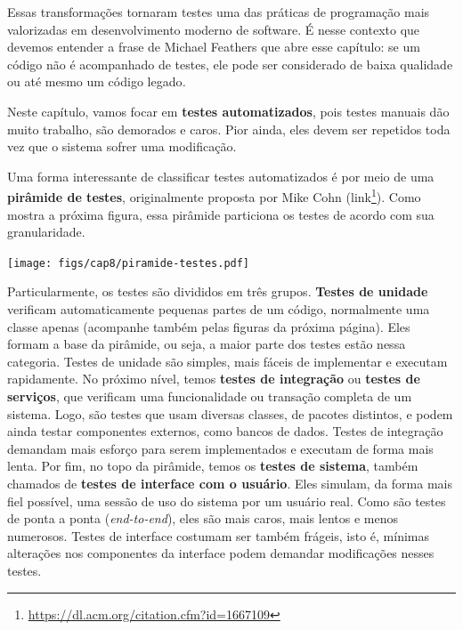 \documentclass[
  11pt,
  twoside]{book}
\DeclareRobustCommand{\href}[2]{#2\footnote{\url{#1}}}
\let\origfigure\figure
\let\endorigfigure\endfigure
\renewenvironment{figure}[1][2] {
    \expandafter\origfigure\expandafter[!h]
} {
    \endorigfigure
}
\begin{document}
Essas transformações tornaram testes uma das práticas de programação
mais valorizadas em desenvolvimento moderno de software. É nesse
contexto que devemos entender a frase de Michael Feathers que abre esse
capítulo: se um código não é acompanhado de testes, ele pode ser
considerado de baixa qualidade ou até mesmo um código legado\emph{.}

Neste capítulo, vamos focar em \textbf{testes automatizados}, pois
testes manuais dão muito trabalho, são demorados e caros. Pior ainda,
eles devem ser repetidos toda vez que o sistema sofrer uma modificação.

 
Uma forma interessante de classificar testes automatizados é por meio de
uma \textbf{pirâmide de testes}, originalmente proposta por Mike Cohn
(\href{https://dl.acm.org/citation.cfm?id=1667109}{link}). Como mostra a
próxima figura, essa pirâmide particiona os testes de acordo com sua
granularidade.

\begin{figure}
\centering
\texttt{[image: figs/cap8/piramide-testes.pdf]}
\caption{Pirâmide de testes}
\end{figure}

 Particularmente, os testes
são divididos em três grupos. \textbf{Testes de unidade} verificam
automaticamente pequenas partes de um código, normalmente uma classe
apenas (acompanhe também pelas figuras da próxima página). Eles formam a
base da pirâmide, ou seja, a maior parte dos testes estão nessa
categoria. Testes de unidade são simples, mais fáceis de implementar e
executam rapidamente. No próximo nível, temos \textbf{testes de
integração} ou \textbf{testes de serviços}, que verificam uma
funcionalidade ou transação completa de um sistema. Logo, são testes que
usam diversas classes, de pacotes distintos, e podem ainda testar
componentes externos, como bancos de dados. Testes de integração
demandam mais esforço para serem implementados e executam de forma mais
lenta. Por fim, no topo da pirâmide, temos os \textbf{testes de
sistema}, também chamados de \textbf{testes de interface com o usuário}.
Eles simulam, da forma mais fiel possível, uma sessão de uso do sistema
por um usuário real. Como são testes de ponta a ponta
(\emph{end-to-end}), eles são mais caros, mais lentos e menos numerosos.
Testes de interface costumam ser também frágeis, isto é, mínimas
alterações nos componentes da interface podem demandar modificações
nesses testes.
\end{document}
